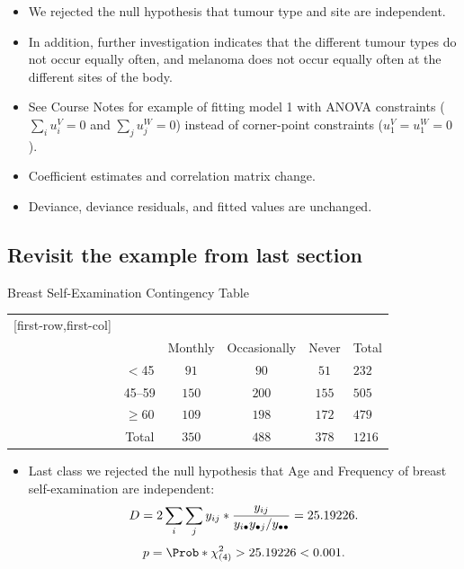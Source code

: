 \documentclass{article}\usepackage[]{graphicx}\usepackage[svgnames]{xcolor}
\let\log\relax%
\begin{document}
\begin{itemize}
      \item We rejected the null hypothesis that tumour type and site are independent.
      \item In addition, further investigation indicates that the different tumour types do not
            occur equally often, and melanoma does not occur equally often at the different
            sites of the body.
      \item See Course Notes for example of fitting model 1 with ANOVA constraints
            ($ \sum_i u_i^V=0 $ and $ \sum_j u_j^W =0$) instead of corner-point constraints ($ u_1^V=u_1^W=0 $).
      \item Coefficient estimates and correlation matrix change.
      \item Deviance, deviance residuals, and fitted values are unchanged.
\end{itemize}
\subsection*{Revisit the example from last section}
\begin{Example}{Breast Self-Examination Contingency Table}
      \begin{center}
            \begin{NiceTabular}{c|ccc|c}[first-row,first-col]
                  &&\\
                  && Monthly & Occasionally & Never & Total\\
                  \midrule
                   & $<$45 & $ 91 $ & $ 90 $ & $ 51 $ & $ 232 $\\
                  & 45--59 & $ 150 $ & $ 200 $ & $ 155 $ & $ 505 $\\
                  & $ \ge $60 & $ 109 $ & $ 198 $ & $ 172 $ & $ 479 $\\
                  \midrule
                  & Total & $ 350 $ & $ 488 $ & $ 378 $ & $ 1216 $
            \end{NiceTabular}
      \end{center}
\end{Example}
\begin{itemize}
      \item Last class we rejected the null hypothesis that Age and Frequency of breast
            self-examination are independent:
            \[ D=2\sum_i\sum_j y_{ij}\log*{\frac{y_{ij}}{y_{i\bullet}y_{\bullet j}/y_{\bullet\bullet}}}=25.19226. \]
            \[ p=\Prob*{\chi^2_{(4)}>25.19226}<0.001. \]
\end{itemize}
\end{document}
